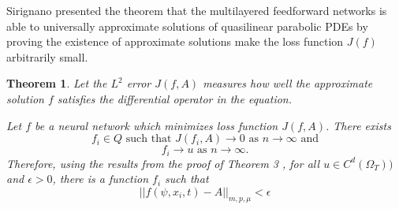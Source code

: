 \documentclass{article}
\newtheorem{theorem}{Theorem}[section]
\begin{document}
Sirignano \cite{sirignano} presented the theorem that the multilayered feedforward networks is able to universally approximate solutions of quasilinear parabolic PDEs by proving the existence of approximate solutions make the loss function $J(f)$ arbitrarily small.

\begin{theorem}\cite{sirignano}
	Let the $L^{2}$ error $J(f,A)$ measures how well the approximate solution $f$ satisfies the differential operator in the equation.

	\noindent \medspace
	Let $f$ be a neural network which minimizes loss function $J(f,A)$. There exists
	\[f_i \in \textit{Q} \textrm{ such that } J(f_{i},A) \rightarrow 0 \textrm{ as } n \rightarrow \infty \text{ and}\]
	\[ f_{i} \rightarrow u  \text{ as } n \rightarrow \infty.\] Therefore, using the results from the proof of Theorem 3 \cite{hornik}, for all $u \in C^{d}(\Omega_{T}))$ and $\epsilon > 0$, there is a function $f_{i}$ such that
	\begin{equation}\label{eq:m_dense}
	||f(\psi, x_{i},t)-A||_{m,p,\mu} < \epsilon
	\end{equation}


\end{theorem}
\end{document}
